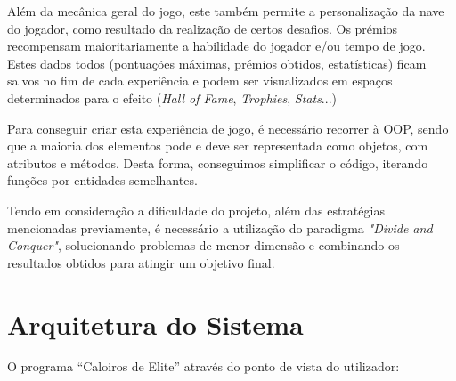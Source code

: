 \documentclass[a4paper,11pt]{article}
\begin{document}
\vspace{8pt}

Além da mecânica geral do jogo, este também permite a personalização da nave do jogador, como resultado da realização de certos desafios. Os prémios recompensam maioritariamente a habilidade do jogador e/ou tempo de jogo. Estes dados todos (pontuações máximas, prémios obtidos, estatísticas) ficam salvos no fim de cada experiência e podem ser visualizados em espaços determinados para o efeito (\textit{Hall of Fame}, \textit{Trophies}, \textit{Stats}...)

\vspace{8pt}

Para conseguir criar esta experiência de jogo, é necessário recorrer à OOP, sendo que a maioria dos elementos pode e deve ser representada como objetos, com atributos e métodos. Desta forma, conseguimos simplificar o código, iterando funções por entidades semelhantes.

\vspace{8pt}

Tendo em consideração a dificuldade do projeto, além das estratégias mencionadas previamente, é necessário a utilização do paradigma \textit{"Divide and Conquer"}, solucionando problemas de menor dimensão e combinando os resultados obtidos para atingir um objetivo final.

\pagebreak

\section{Arquitetura do Sistema}

\vspace{8pt}


O programa “Caloiros de Elite” através do ponto de vista do utilizador:
\end{document}
